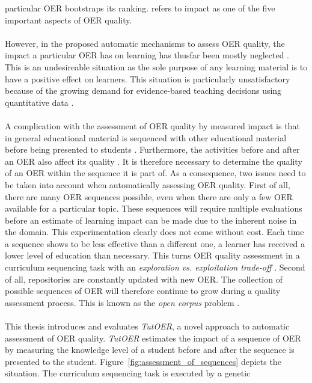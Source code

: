 particular OER bootstraps its ranking. \citet{Camilleri2014} refers to impact
as one of the five important aspects of OER quality.\\\\
\noindent
However, in the proposed automatic mechanisms to assess OER quality, the impact
a particular OER has on learning has thusfar been mostly neglected
\citep{Kay2007}. This is an undesireable situation as the sole purpose of any
learning material is to have a positive effect on learners. This situation is
particularly unsatisfactory because of the growing demand for evidence-based
teaching decisions using quantitative data \citep{Wayman2005, Marsh2006, Spillane2012, Clow2013}.\\\\
\noindent
A complication with the assessment of OER quality by measured impact is that in
general educational material is sequenced with other educational material
before being presented to students \citep{Brusilovsky1992, Quinn2000}.
Furthermore, the activities before and after an OER also affect its quality
\citep{Duval2006}. It is therefore necessary to determine the quality of an OER
within the sequence it is part of. As a consequence, two issues need to be
taken into account when automatically assessing OER quality. First of all,
there are many OER sequences possible, even when there are only a few OER
available for a particular topic. These sequences will require multiple
evaluations before an estimate of learning impact can be made due to the
inherent noise in the domain. This experimentation clearly does not come
without cost. Each time a sequence shows to be less effective than a different
one, a learner has received a lower level of education than necessary. This
turns OER quality assessment in a curriculum sequencing task
\citep{AlMuhaideb2011} with an \emph{exploration vs. exploitation trade-off}
\citep{Holland1992}. Second of all, repositories are constantly updated with
new OER. The collection of possible sequences of OER will therefore continue to
grow during a quality assessment process. This is known as the \emph{open
corpus} problem \citep{Brusilovsky2007}.\\\\
\noindent
This thesis introduces and evaluates \emph{TutOER}, a novel approach to
automatic assessment of OER quality. \emph{TutOER} estimates the impact of a
sequence of OER by measuring the knowledge level of a student before and after the
sequence is presented to the student. Figure~\ref{fig:assessment_of_sequences}
depicts the situation. The curriculum sequencing task is executed by a genetic
